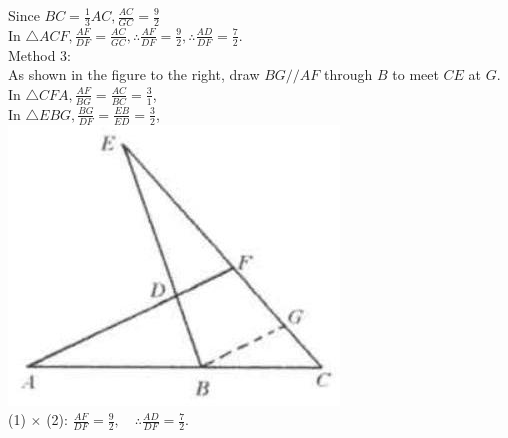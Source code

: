 \documentclass{article}
\begin{document}
Since \(B C=\frac{1}{3} A C, \frac{A C}{G C}=\frac{9}{2}\)\\
In \(\triangle A C F, \frac{A F}{D F}=\frac{A C}{G C}, \therefore \frac{A F}{D F}=\frac{9}{2}, \therefore \frac{A D}{D F}=\frac{7}{2}\).\\
Method 3:\\
As shown in the figure to the right, draw \(B G / / A F\) through \(B\) to meet \(C E\) at \(G\).\\
In \(\triangle C F A, \frac{A F}{B G}=\frac{A C}{B C}=\frac{3}{1}\),\\
In \(\triangle E B G, \frac{B G}{D F}=\frac{E B}{E D}=\frac{3}{2}\),\\
\centering
\includegraphics[width=\textwidth]{images/112(1).jpg}\\
(1) \(\times\) (2): \(\frac{A F}{D F}=\frac{9}{2}, \quad \therefore \frac{A D}{D F}=\frac{7}{2}\).
\end{document}
